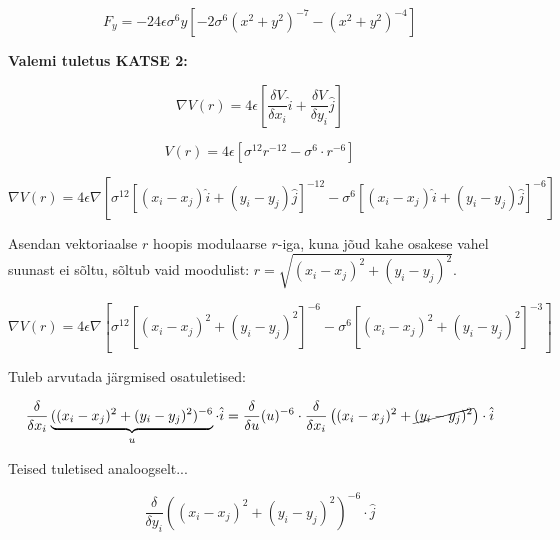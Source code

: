 \begin{flushleft}
\begin{equation} \label{eq_5.6}
F_{y}=-24 \epsilon \sigma^{6} y \left[ -2 \sigma^{6}(x^{2}+y^{2})^{-7}-(x^{2}+y^{2})^{-4} \right]
\end{equation}

\textbf{Valemi tuletus KATSE 2:}

\begin{equation} \label{eq_5.7}
\nabla V(r)=4 \epsilon \left[ \dfrac{\delta V}{\delta x_{i} }\hat{i}+\dfrac{\delta V}{\delta y_{i}}\hat{j} \right]
\end{equation}

\begin{equation}
V(r)=4 \epsilon \left[ \sigma^{12} r^{-12}-\sigma^{6} \cdot r^{-6} \right]
\end{equation}


\begin{equation} \label{eq_5.8}
\nabla V(r)=4 \epsilon \nabla \left[ \sigma^{12} \left[(x_{i}-x_{j})\hat{i} + (y_{i}-y_{j}) \hat{j} \right]^{-12} -\sigma^{6} \left[ (x_{i}-x_{j})\hat{i} +(y_{i}-y_{j})\hat{j} \right]^{-6} \right]
\end{equation}

Asendan vektoriaalse $r$ hoopis modulaarse $r$-iga, kuna jõud kahe osakese vahel suunast ei sõltu, sõltub vaid moodulist: $r=\sqrt{(x_{i}-x_{j})^{2}+(y_{i}-y_{j})^{2}}$.

\begin{equation} \label{eq_5.9}
\nabla V(r)=4 \epsilon \nabla \left[ \sigma^{12} \left[(x_{i}-x_{j})^{2}+(y_{i}-y_{j})^{2} \right]^{-6} -\sigma^{6} \left[ (x_{i}-x_{j})^{2}+(y_{i}-y_{j})^{2} \right]^{-3} \right]
\end{equation}


Tuleb arvutada järgmised osatuletised:

\begin{equation} \label{eq_5.11}
 \dfrac{\delta }{\delta x_{i}} \underbrace{((x_{i}-x_{j})^{2}+(y_{i}-y_{j})^{2})^{-6}}_{u} \cdot \hat{i}=\dfrac{\delta}{\delta u} (u)^{-6} \cdot  \dfrac{\delta }{\delta x_{i}} \left( (x_{i}-x_{j})^{2}+\cancel{(y_{i}-y_{j})^{2}} \right)\cdot \hat{i}
\end{equation}

Teised tuletised analoogselt...

\begin{equation} \label{eq_5.12}
\dfrac{\delta }{\delta y_{i}}((x_{i}-x_{j})^{2}+(y_{i}-y_{j})^{2})^{-6} \cdot \hat{j}
\end{equation}


\end{flushleft}
